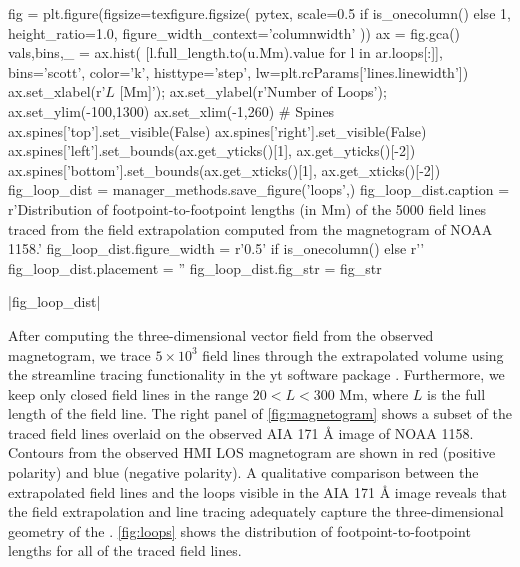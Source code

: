 \begin{pycode}
fig = plt.figure(figsize=texfigure.figsize(
    pytex,
    scale=0.5 if is_onecolumn() else 1,
    height_ratio=1.0,
    figure_width_context='columnwidth'
))
ax = fig.gca()
vals,bins,_ = ax.hist(
    [l.full_length.to(u.Mm).value for l in ar.loops[:]],
    bins='scott', color='k', histtype='step', lw=plt.rcParams['lines.linewidth'])
ax.set_xlabel(r'$L$ [Mm]');
ax.set_ylabel(r'Number of Loops');
ax.set_ylim(-100,1300)
ax.set_xlim(-1,260)
# Spines
ax.spines['top'].set_visible(False)
ax.spines['right'].set_visible(False)
ax.spines['left'].set_bounds(ax.get_yticks()[1], ax.get_yticks()[-2])
ax.spines['bottom'].set_bounds(ax.get_xticks()[1], ax.get_xticks()[-2])
fig_loop_dist = manager_methods.save_figure('loops',)
fig_loop_dist.caption = r'Distribution of footpoint-to-footpoint lengths (in Mm) of the 5000 field lines traced from the field extrapolation computed from the magnetogram of NOAA 1158.'
fig_loop_dist.figure_width = r'0.5\columnwidth' if is_onecolumn() else r'\columnwidth'
fig_loop_dist.placement = ''
fig_loop_dist.fig_str = fig_str
\end{pycode}
|fig_loop_dist|

After computing the three-dimensional vector field from the observed magnetogram, we trace $5\times10^3$ field lines through the extrapolated volume using the streamline tracing functionality in the yt software package \citep{turk_yt_2011}.  Furthermore, we keep only closed field lines in the range $20<L<300$ Mm, where $L$ is the full length of the field line. The right panel of \autoref{fig:magnetogram} shows a subset of the traced field lines overlaid on the observed AIA 171 \AA{} image of NOAA 1158. Contours from the observed HMI LOS magnetogram are shown in red (positive polarity) and blue (negative polarity). A qualitative comparison between the extrapolated field lines and the loops visible in the AIA 171 \AA{} image reveals that the field extrapolation and line tracing adequately capture the three-dimensional geometry of the \AR{}. \autoref{fig:loops} shows the distribution of footpoint-to-footpoint lengths for all of the traced field lines.

